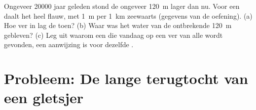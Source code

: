 \begin{exercise}[$\star\star\star$]\label{exo:g8:ice-on-earth:12}
Ongeveer \num{20000} jaar geleden stond de  ongeveer \qty{120}{m}
lager dan nu. Voor een  daalt het  heel flauw, met
\qty{1}{m} per \qty{1}{km} zeewaarts (gegevens van de oefening). (a) Hoe
ver in  lag de  toen? (b) Waar was het water van de ontbrekende
\qty{120}{m} gebleven? (c) Leg uit waarom een  die vandaag op
een  ver van alle  wordt gevonden, een aanwijzing is voor
dezelfde .
\end{exercise}

\section{Probleem: De lange terugtocht van een gletsjer}

